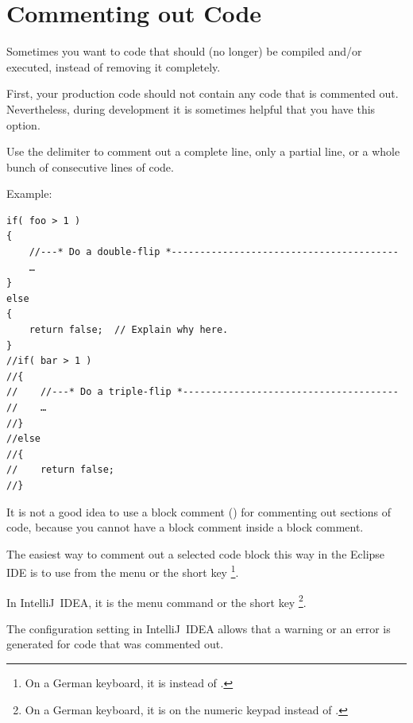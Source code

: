 \chapter{Commenting out Code}
Sometimes you want to  code that should (no longer) be compiled and/or executed, instead of removing it completely.

First, your production code should not contain any code that is commented out. Nevertheless, during development it is sometimes helpful that you have this option.

Use the \bdq{\lstinline|//|} delimiter to comment out a complete line, only a partial line, or a whole bunch of consecutive lines of code.

Example:
\begin{lstlisting}
if( foo > 1 )
{
    //---* Do a double-flip *----------------------------------------
    …
}
else
{
    return false;  // Explain why here.
}
//if( bar > 1 )
//{
//    //---* Do a triple-flip *--------------------------------------
//    …
//}
//else
//{
//    return false;
//}
\end{lstlisting}

It is not a good idea to use a block comment () for commenting out sections of code, because you cannot have a block comment inside a block comment.

The easiest way to comment out a selected code block this way in the Eclipse IDE is to use  from the menu or the short key \footnote{On a German keyboard, it is  instead of \bdq{/}.}.

In IntelliJ~IDEA, it is the menu command  or the short key \footnote{On a German keyboard, it is  on the numeric keypad instead of \bdq{/}.}.

The configuration setting  in IntelliJ~IDEA allows that a warning or an error is generated for code that was commented out.


